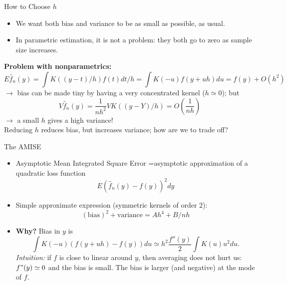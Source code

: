 \documentclass[11pt,handout,xcolor=pdftex,dvipsnames,table,mathserif,aspectratio=169]{beamer}
\begin{document}
\begin{frame}{How to Choose $h$}
\begin{itemize}
\item We want both bias and variance to be as small as possible, as usual. 
\item In parametric estimation, it is not a problem: they both go to zero as sample size increases.
\end{itemize}
 {\bf Problem with nonparametrics:}
$$E\hat{f}_n(y)=\int K((y-t)/h)f(t)dt/h=\int K(-u)f(y+uh)du=f(y)+O(h^2)$$
$\rightarrow$ bias can be made tiny by having a very concentrated kernel ($h\simeq 0$);
but 
$$V\hat{f}_n(y)=\frac{1}{nh^2}VK((y-Y)/h)=O\left(\frac{1}{nh}\right)$$
$\rightarrow$ a small $h$ gives a high variance! \\
Reducing $h$ reduces bias, but increases variance; how are we to
trade off?
\end{frame}

\begin{frame}{The AMISE}
\begin{itemize}
\item  Asymptotic Mean Integrated Square Error =asymptotic approximation of a quadratic loss function
$$E\left({\hat f}_n(y)-f(y)\right)^2 dy$$
\item Simple approximate expression (symmetric kernels of order 2): $$(\mbox{bias})^2+\mbox{variance}= A
h^4+B/nh$$
\item {\bf Why?} Bias in $y$ is
$$
\int K(-u)\left(f(y+uh)-f(y)\right)du \simeq h^2 \frac{f''(y)}{2}\int K(u)u^2 du.
$$
{\em Intuition:} if $f$ is close to linear around $y$, then averaging
does not hurt us: $f"(y)\simeq 0$ and the bias is small. The bias is larger  (and negative) at the mode of $f$.
\end{itemize}
\end{frame}

\end{document}
